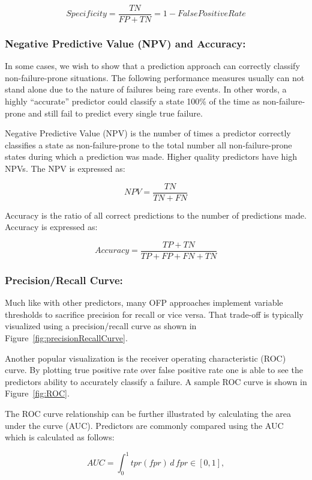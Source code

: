 \[ Specificity 
	= \dfrac{TN}{FP + TN} = 1 - False Positive Rate
\]

\subsubsection{Negative Predictive Value (NPV) and Accuracy:}
In some cases, we wish to show that a prediction approach can correctly
classify non-failure-prone situations.  The following performance measures 
usually can not stand alone due to the nature of failures being rare events.
In other words, a highly ``accurate'' predictor could classify a state 100\% of
the time as non-failure-prone and still fail to predict every single true
failure.

Negative Predictive Value (NPV) is the number of times a predictor correctly
classifies a state as non-failure-prone to the total number all
non-failure-prone states during which a prediction was made.  Higher quality
predictors have high NPVs.  The NPV is expressed as:

\[ \mathit{NPV}
	= \dfrac{TN}{TN + FN}
\]

Accuracy is the ratio of all correct predictions to the number of predictions
made.  Accuracy is expressed as:

\[ Accuracy 
	= \dfrac{TP + TN}{TP + FP + FN + TN}
\]

\subsubsection{Precision/Recall Curve:}
Much like with other predictors, many OFP approaches implement variable
thresholds to sacrifice precision for recall or vice versa.  That trade-off is
typically visualized using a precision/recall curve as shown in
Figure~\ref{fig:precisionRecallCurve}.

\figprecisionRecallCurve

Another popular visualization is the receiver operating characteristic (ROC)
curve.  By plotting true positive rate over false positive rate one is able to
see the predictors ability to accurately classify a failure.  A sample ROC
curve is shown in Figure~\ref{fig:ROC}.

\figROC

The ROC curve relationship can be further illustrated by calculating the area
under the curve (AUC).  Predictors are commonly compared using the AUC which is
calculated as follows:

$$AUC = \int_{0}^{1} \mathit{tpr}(\mathit{fpr}) \,d\,\mathit{fpr} \in [0,1],$$

